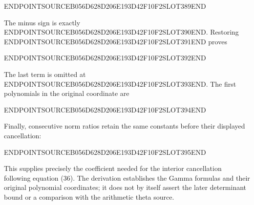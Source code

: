 ENDPOINTSOURCEB056D628D206E193D42F10F2SLOT389END

The minus sign is exactly ENDPOINTSOURCEB056D628D206E193D42F10F2SLOT390END. Restoring ENDPOINTSOURCEB056D628D206E193D42F10F2SLOT391END proves

ENDPOINTSOURCEB056D628D206E193D42F10F2SLOT392END

The last term is omitted at ENDPOINTSOURCEB056D628D206E193D42F10F2SLOT393END. The first polynomials in the original coordinate are

ENDPOINTSOURCEB056D628D206E193D42F10F2SLOT394END

Finally, consecutive norm ratios retain the same constants before their displayed cancellation:

ENDPOINTSOURCEB056D628D206E193D42F10F2SLOT395END

This supplies precisely the coefficient needed for the interior cancellation following equation (36). The derivation establishes the Gamma formulas and their original polynomial coordinates; it does not by itself assert the later determinant bound or a comparison with the arithmetic theta source.
